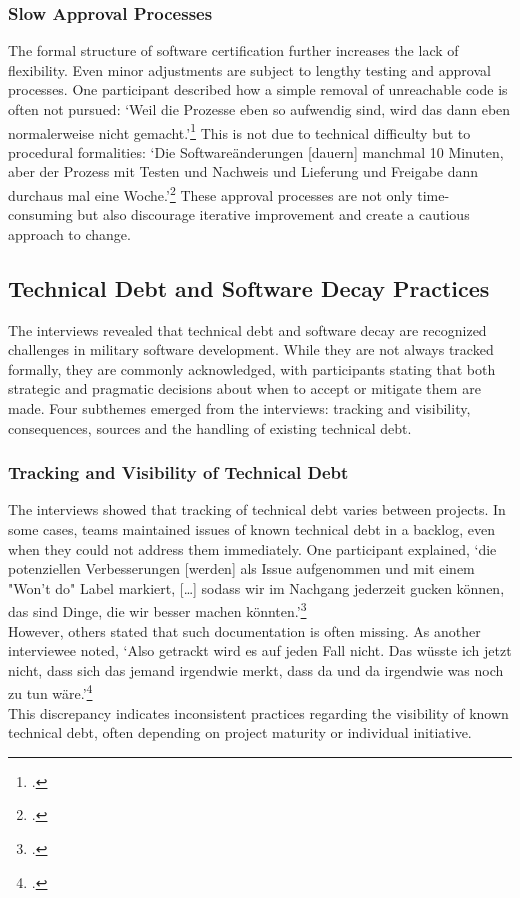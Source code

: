 \subsubsection{Slow Approval Processes}
The formal structure of software certification further increases the lack of flexibility. Even minor adjustments are subject to lengthy testing and approval processes. One participant described how a simple removal of unreachable code is often not pursued:
`Weil die Prozesse eben so aufwendig sind, wird das dann eben normalerweise nicht gemacht.'\footcite{interview2} This is not due to technical difficulty but to procedural formalities: `Die Softwareänderungen [dauern] manchmal 10 Minuten, aber der Prozess mit Testen und Nachweis und Lieferung und Freigabe dann durchaus mal eine Woche.'\footcite{interview1}
These approval processes are not only time-consuming but also discourage iterative improvement and create a cautious approach to change.\\

\subsection{Technical Debt and Software Decay Practices}
The interviews revealed that technical debt and software decay are recognized challenges in military software development. While they are not always tracked formally, they are commonly acknowledged, with participants stating that both strategic and pragmatic decisions about when to accept or mitigate them are made.
Four subthemes emerged from the interviews: tracking and visibility, consequences, sources and the handling of existing technical debt.

\subsubsection{Tracking and Visibility of Technical Debt}
The interviews showed that tracking of technical debt varies between projects. In some cases, teams maintained issues of known technical debt in a backlog, even when they could not address them immediately. One participant explained, `die potenziellen Verbesserungen [werden] als Issue aufgenommen und mit einem "Won't do" Label markiert, [\ldots]
sodass wir im Nachgang jederzeit gucken können, das sind Dinge, die wir besser machen könnten.'\footcite{interview3}\\
However, others stated that such documentation is often missing. As another interviewee noted, `Also getrackt wird es auf jeden Fall nicht. Das wüsste ich jetzt nicht, dass sich das jemand irgendwie merkt, dass da und da irgendwie was noch zu tun wäre.'\footcite{interview1}\\
This discrepancy indicates inconsistent practices regarding the visibility of known technical debt, often depending on project maturity or individual initiative.\\

